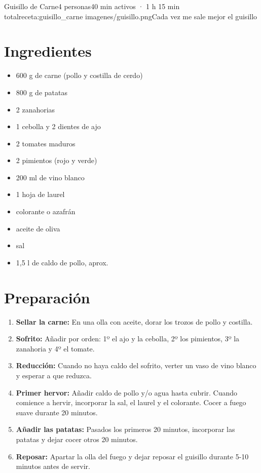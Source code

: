 \begin{recetaConImagen}{Guisillo de Carne}{4 personas}{40 min activos · 1 h 15 min total}{receta:guisillo_carne}
    {imagenes/guisillo.png}{Cada vez me sale mejor el guisillo}


    \begin{minipage}[t]{0.35\textwidth}
        \section*{Ingredientes}
        \begin{itemize}[leftmargin=*]
            \item 600 g de carne (pollo y costilla de cerdo)
            \item 800 g de patatas
            \item 2 zanahorias
            \item 1 cebolla y 2 dientes de ajo
            \item 2 tomates maduros
            \item 2 pimientos (rojo y verde)
            \item 200 ml de vino blanco
            \item 1 hoja de laurel
            \item colorante o azafrán
            \item aceite de oliva
            \item sal
            \item 1,5 l de caldo de pollo, aprox.
        \end{itemize}
    \end{minipage}
    \hfill
    \begin{minipage}[t]{0.6\textwidth}
        \section*{Preparación}
        \begin{enumerate}
            \item \textbf{Sellar la carne:} En una olla con aceite, dorar los trozos de pollo y costilla.
            \item \textbf{Sofrito:} Añadir por orden: 1º el ajo y la cebolla, 2º los pimientos, 3º la zanahoria y 4º el tomate.
            \item \textbf{Reducción:} Cuando no haya caldo del sofrito, verter un vaso de vino blanco y esperar a que reduzca.
            \item \textbf{Primer hervor:} Añadir caldo de pollo y/o agua hasta cubrir. Cuando comience a hervir, incorporar la sal, el laurel y el colorante. Cocer a fuego suave durante 20 minutos.
            \item \textbf{Añadir las patatas:} Pasados los primeros 20 minutos, incorporar las patatas y dejar cocer otros 20 minutos.
            \item \textbf{Reposar:} Apartar la olla del fuego y dejar reposar el guisillo durante 5-10 minutos antes de servir.
        \end{enumerate}
    \end{minipage}


\end{recetaConImagen}
